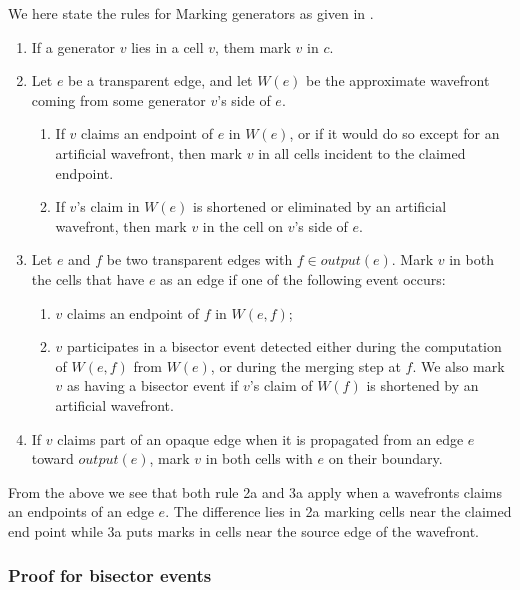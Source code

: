 We here state the rules for Marking generators as given in \cite{HershbergerS99}.

\begin{enumerate}
\item If a generator $v$ lies in a cell $v$, them mark $v$ in $c$.
\item Let $e$ be a transparent edge, and let $W(e)$ be the approximate wavefront coming from 
	  some generator $v$'s side of $e$.
      \begin{enumerate}[a]
      \item If $v$ claims an endpoint of $e$ in $W(e)$, or if it would do so except for an 
            artificial wavefront, then mark $v$ in all cells incident to the claimed endpoint.
      \item If $v$'s claim in $W(e)$ is shortened or eliminated by an artificial wavefront, 
      		then mark $v$ in the cell on $v$'s side of $e$.
      \end{enumerate}
\item Let $e$ and $f$ be two transparent edges with $f \in output(e)$. Mark $v$ in both the 
	  cells that have $e$ as an edge if one of the following event occurs:
      \begin{enumerate}[a]
      \item $v$ claims an endpoint of $f$ in $W(e,f)$;
      \item $v$ participates in a bisector event detected either during the computation of 
      		$W(e,f)$ from $W(e)$, or during the merging step at $f$. We also mark $v$ as 
            having a bisector event if $v$'s claim of $W(f)$ is shortened by an artificial 
            wavefront.
      \end{enumerate}
\item If $v$ claims part of an opaque edge when it is propagated from an edge $e$ toward 
	  $output(e)$, mark $v$ in both cells with $e$ on their boundary.
\end{enumerate}

From the above we see that both rule 2a and 3a apply when a wavefronts claims an endpoints of 
an edge $e$. The difference lies in 2a marking cells near the claimed end point while 3a puts 
marks in cells near the source edge of the wavefront.


\subsubsection{Proof for bisector events}

